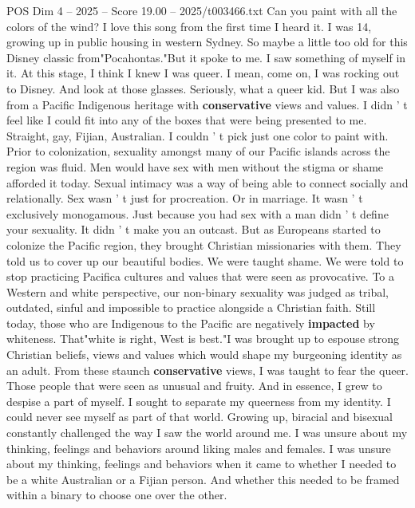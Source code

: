 \begin{textsample}{POS Dim 4 – 2025 – Score 19.00 – 2025/t003466.txt}  \label{ex:f4_pos_002}
Can you paint with all the colors of the wind?
I love this song from the first time I heard it.
I was 14, growing up in public housing in western Sydney.
So maybe a little too old for this Disney classic from"Pocahontas."But it spoke to me.
I saw something of myself in it.
At this stage, I think I knew I was queer.
I mean, come on, I was rocking out to Disney.
And look at those glasses.
Seriously, what a queer kid.
But I was also from a Pacific Indigenous heritage with \textbf{conservative} views and values.
I didn ' t feel like I could fit into any of the boxes that were being presented to me.
Straight, gay, Fijian, Australian.
I couldn ' t pick just one color to paint with.
Prior to colonization, sexuality amongst many of our Pacific islands across the region was fluid.
Men would have sex with men without the stigma or shame afforded it today.
Sexual intimacy was a way of being able to connect socially and relationally.
Sex wasn ' t just for procreation.
Or in marriage.
It wasn ' t exclusively monogamous.
Just because you had sex with a man didn ' t define your sexuality.
It didn ' t make you an outcast.
But as Europeans started to colonize the Pacific region, they brought Christian missionaries with them.
They told us to cover up our beautiful bodies.
We were taught shame.
We were told to stop practicing Pacifica cultures and values that were seen as provocative.
To a Western and white perspective, our non-binary sexuality was judged as tribal, outdated, sinful and impossible to practice alongside a Christian faith.
Still today, those who are Indigenous to the Pacific are negatively \textbf{impacted} by whiteness.
That"white is right, West is best."I was brought up to espouse strong Christian beliefs, views and values which would shape my burgeoning identity as an adult.
From these staunch \textbf{conservative} views, I was taught to fear the queer.
Those people that were seen as unusual and fruity.
And in essence, I grew to despise a part of myself.
I sought to separate my queerness from my identity.
I could never see myself as part of that world.
Growing up, biracial and bisexual constantly challenged the way I saw the world around me.
I was unsure about my thinking, feelings and behaviors around liking males and females.
I was unsure about my thinking, feelings and behaviors when it came to whether I needed to be a white Australian or a Fijian person.
And whether this needed to be framed within a binary to choose one over the other.

\end{textsample}
